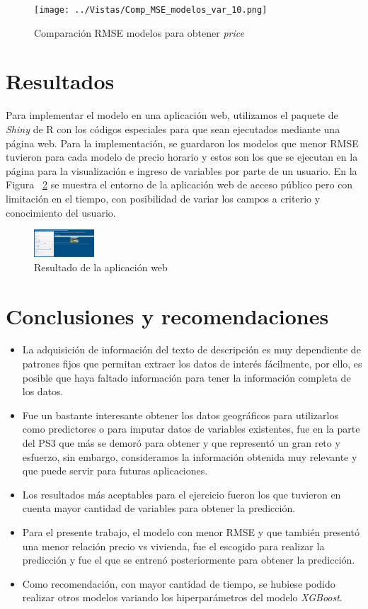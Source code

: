 \documentclass[conference, 10pt]{IEEEtran}
\begin{document}
\begin{figure}[htbp]
\centerline{\texttt{[image: ../Vistas/Comp\_MSE\_modelos\_var\_10.png]}}
\caption{Comparación RMSE modelos para obtener \textit{price}}
\label{fig_3}
\end{figure}


\section{Resultados}
Para implementar el modelo en una aplicación web, utilizamos el paquete de \textit{Shiny} de R con los códigos especiales para que sean ejecutados mediante una página web. Para la implementación, se guardaron los modelos que menor RMSE tuvieron para cada modelo de precio horario y estos son los que se ejecutan en la página para la visualización e ingreso de variables por parte de un usuario. En la Figura ~\ref{fig_3} se muestra el entorno de la aplicación web de acceso público pero con limitación en el tiempo, con posibilidad de variar los campos a criterio y conocimiento del usuario. 

\begin{figure}[htbp]
\centerline{\includegraphics[width=0.2\textwidth]{../Images/Resultado_Trabajo_final.png}}
\caption{Resultado de la aplicación web}
\label{fig_3}
\end{figure}

\section{Conclusiones y recomendaciones}
\begin{itemize}
\item La adquisición de información del texto de descripción es muy dependiente de patrones fijos que permitan extraer los datos de interés fácilmente, por ello, es posible que haya faltado información para tener la información completa de los datos.
\item Fue un bastante interesante obtener los datos geográficos para utilizarlos como predictores o para imputar datos de variables existentes, fue en la parte del PS3 que más se demoró para obtener y que representó un gran reto y esfuerzo, sin embargo, consideramos la información obtenida muy relevante y que puede servir para futuras aplicaciones.
\item Los resultados más aceptables para el ejercicio fueron los que tuvieron en cuenta mayor cantidad de variables para obtener la predicción.
\item Para el presente trabajo, el modelo con menor RMSE y que también presentó una menor relación precio vs vivienda, fue el escogido para realizar la predicción y fue el que se entrenó posteriormente para obtener la predicción.
\item Como recomendación, con mayor cantidad de tiempo, se hubiese podido realizar otros modelos variando los hiperparámetros del modelo \textit{XGBoost}. 

\end{itemize}
\end{document}
